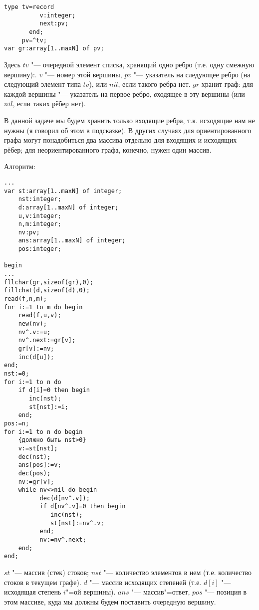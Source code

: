 \begin{codesample}\begin{verbatim}
type tv=record
          v:integer;
          next:pv;
       end;
     pv=^tv;
var gr:array[1..maxN] of pv;
\end{verbatim}\end{codesample}
Здесь $tv$ "--- очередной элемент списка, хранящий одно ребро (т.е. одну смежную вершину):. $v$ "---
номер этой вершины, $pv$ "--- указатель на следующее ребро (на следующий элемент типа $tv$), или $nil$,
если такого ребра нет.
$gr$ хранит граф: для каждой вершины "--- указатель на первое ребро, \textit{в}ходящее в эту вершины (или $nil$,
если таких рёбер нет).

В данной задаче мы будем хранить только входящие ребра, т.к. исходящие нам не нужны (я говорил об этом
в подсказке). В других случаях для ориентированного графа могут понадобиться два массива отдельно для
входящих и исходящих рёбер; для неориентированного графа, конечно, нужен один массив.

Алгоритм:
\begin{codesamplec}{3}\begin{verbatim}
...
var st:array[1..maxN] of integer;
    nst:integer;
    d:array[1..maxN] of integer;
    u,v:integer;
    n,m:integer;
    nv:pv;
    ans:array[1..maxN] of integer;
    pos:integer;
    
begin
...
fllchar(gr,sizeof(gr),0);
fillchat(d,sizeof(d),0);
read(f,n,m);
for i:=1 to m do begin
    read(f,u,v);
    new(nv);
    nv^.v:=u;
    nv^.next:=gr[v];
    gr[v]:=nv;
    inc(d[u]);
end;
nst:=0;
for i:=1 to n do
    if d[i]=0 then begin
       inc(nst);
       st[nst]:=i;
    end;
pos:=n;
for i:=1 to n do begin
    {должно быть nst>0}
    v:=st[nst];
    dec(nst);
    ans[pos]:=v;
    dec(pos);
    nv:=gr[v];
    while nv<>nil do begin
          dec(d[nv^.v]);
          if d[nv^.v]=0 then begin
             inc(nst);
             st[nst]:=nv^.v;
          end;
          nv:=nv^.next;
    end;
end;
\end{verbatim}\end{codesamplec}
$st$ "--- массив (стек) стоков; $nst$ "--- количество элементов в нем (т.е. количество стоков в текущем графе).
$d$ "--- массив исходящих степеней (т.е. $d[i]$ "--- исходящая степень $i$"=ой вершины). $ans$ "--- массив"=ответ,
$pos$ "--- позиция в этом массиве, куда мы должны будем поставить очередную вершину.


